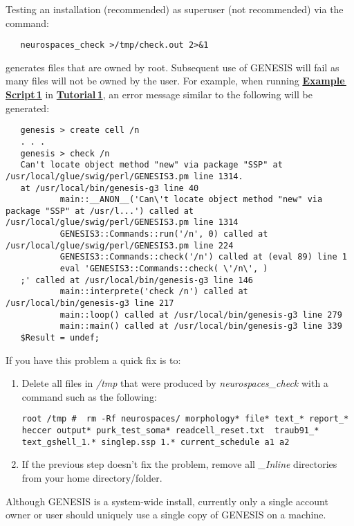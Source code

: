 \documentclass[12pt]{article}
\begin{document}
\begin{enumerate}
Testing an installation (recommended) as superuser (not recommended) via the command:
\begin{verbatim}
   neurospaces_check >/tmp/check.out 2>&1
\end{verbatim}
generates files that are owned by root. Subsequent use of GENESIS will fail as many files will not be owned by the user. For example, when running \href{../example-script1/example-script1.tex}{\bf Example\,Script\,1} in \href{../tutorial1/tutorial1.tex}{\bf Tutorial\,1}, an error message similar to the following will be generated:
\begin{verbatim}
   genesis > create cell /n
   . . .
   genesis > check /n
   Can't locate object method "new" via package "SSP" at /usr/local/glue/swig/perl/GENESIS3.pm line 1314.
   at /usr/local/bin/genesis-g3 line 40
           main::__ANON__('Can\'t locate object method "new" via package "SSP" at /usr/l...') called at /usr/local/glue/swig/perl/GENESIS3.pm line 1314
           GENESIS3::Commands::run('/n', 0) called at /usr/local/glue/swig/perl/GENESIS3.pm line 224
           GENESIS3::Commands::check('/n') called at (eval 89) line 1
           eval 'GENESIS3::Commands::check( \'/n\', )
   ;' called at /usr/local/bin/genesis-g3 line 146
           main::interprete('check /n') called at /usr/local/bin/genesis-g3 line 217
           main::loop() called at /usr/local/bin/genesis-g3 line 279
           main::main() called at /usr/local/bin/genesis-g3 line 339
   $Result = undef;
 \end{verbatim}
 If you have this problem a quick fix is to:
 \begin{enumerate}
    \item Delete all files in {\it /tmp} that were produced by {\it neurospaces\_check} with a command such as the following:
    \begin{verbatim}
root /tmp #  rm -Rf neurospaces/ morphology* file* text_* report_* heccer output* purk_test_soma* readcell_reset.txt  traub91_* text_gshell_1.* singlep.ssp 1.* current_schedule a1 a2
    \end{verbatim}
    
    \item If the previous step doesn't fix the problem, remove all {\it \_Inline} directories from your home directory/folder.
 \end{enumerate}
 Although GENESIS is a system-wide install, currently only a single account owner or user should uniquely use a single copy of GENESIS on a machine.
\end{enumerate}
\end{document}
